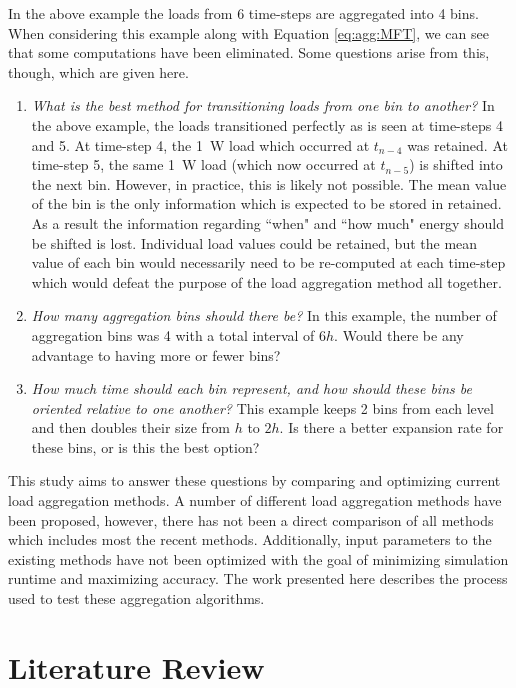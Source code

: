 \documentclass[review,12pt]{elsarticle}
\begin{document}
In the above example the loads from 6 time-steps are aggregated into 4 bins. When considering this example along with Equation \ref{eq:agg:MFT}, we can see that some computations have been eliminated. Some questions arise from this, though, which are given here.

\begin{enumerate}
    \item \textit{What is the best method for transitioning loads from one bin to another?} In the above example, the loads transitioned perfectly as is seen at time-steps 4 and 5. At time-step 4, the \SI{1}{\watt} load which occurred at $t_{n-4}$ was retained. At time-step 5, the same \SI{1}{\watt} load (which now occurred at $t_{n-5}$) is shifted into the next bin. However, in practice, this is likely not possible. The mean value of the bin is the only information which is expected to be stored in retained. As a result the information regarding ``when" and ``how much" energy should be shifted is lost. Individual load values could be retained, but the mean value of each bin would necessarily need to be re-computed at each time-step which would defeat the purpose of the load aggregation method all together.
    \item \textit{How many aggregation bins should there be?} In this example, the number of aggregation bins was 4 with a total interval of $6h$. Would there be any advantage to having more or fewer bins?
    \item \textit{How much time should each bin represent, and how should these bins be oriented relative to one another?} This example keeps 2 bins from each level and then doubles their size from $h$ to $2h$. Is there a better expansion rate for these bins, or is this the best option?
\end{enumerate}

This study aims to answer these questions by comparing and optimizing current load aggregation methods. A number of different load aggregation methods have been proposed, however, there has not been a direct comparison of all methods which includes most the recent methods. Additionally, input parameters to the existing methods have not been optimized with the goal of minimizing simulation runtime and maximizing accuracy. The work presented here describes the process used to test these aggregation algorithms.

\section{Literature Review}
\end{document}
